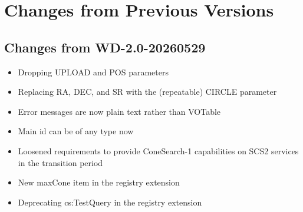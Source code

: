 \documentclass[11pt,a4paper]{ivoa}
\begin{document}
\section{Changes from Previous Versions}

\subsection{Changes from WD-2.0-20260529}

\begin{itemize}
\item Dropping UPLOAD and POS parameters
\item Replacing RA, DEC, and SR with the (repeatable) CIRCLE parameter
\item Error messages are now plain text rather than VOTable
\item Main id can be of any type now
\item Loosened requirements to provide ConeSearch-1 capabilities
on SCS2 services in the transition period
\item New maxCone item in the registry extension
\item Deprecating cs:TestQuery in the registry extension
\end{itemize}



\end{document}
